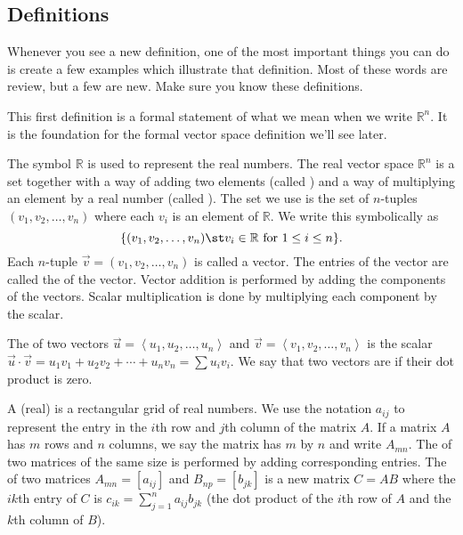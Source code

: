 \subsection{Definitions}

Whenever you see a new definition, one of the most important things you can do is create a few examples which illustrate that definition.  Most of these words are review, but a few are new.  Make sure you know these definitions.

This first definition is a formal statement of what we mean when we write $\mathbb{R}^n$.  It is the foundation for the formal vector space definition we'll see later.
\begin{definition}
The symbol $\mathbb{R}$ is used to represent the real numbers.  
The real vector space $\mathbb{R}^n$ is a set together with a way of adding two elements (called ) and a way of multiplying an element by a real number (called ).  
The set we use is the set of $n$-tuples $(v_1,v_2,\ldots, v_n)$ where each $v_i$ is an element of $\mathbb{R}$. 
We write this symbolically as 
$$
\{ (v_1,v_2,\ldots, v_n)\st v_i\in \mathbb{R} \text{ for } 1\leq i\leq n\}.$$
Each $n$-tuple $\vec v = (v_1,v_2,\ldots, v_n)$ is called a vector. 
The entries of the vector are called the  of the vector.  Vector addition is performed by adding the components of the vectors. Scalar multiplication is done by multiplying each component by the scalar. 
\end{definition}


\begin{definition} 
%
\label{def dot product}
The  of two vectors $\vec u = \left<u_1,u_2,\ldots,u_n\right>$ and $\vec v =\left<v_1,v_2,\ldots,v_n\right>$ is the scalar $\vec u\cdot \vec v = u_1v_1+u_2v_2+\cdots+u_nv_n = \sum u_iv_i$. We say that two vectors are  if their dot product is zero.
\end{definition}

\begin{definition} \label{def matrix product} 
A (real)  is a rectangular grid of real numbers.
We use the notation $a_{ij}$ to represent the entry in the $i$th row and $j$th column of the matrix $A$.  
If a matrix $A$ has $m$ rows and $n$ columns, we say the matrix has  $m$ by $n$ and write $A_{mn}$. 
The  of two matrices of the same size is performed by adding corresponding entries.  
The  of two matrices $A_{m n} = [a_{ij}]$ and $B_{np} =[b_{jk}]$ is a new matrix $C=AB$ where the $ik$th entry of $C$ is $c_{ik}=\sum_{j=1}^n a_{ij}b_{jk}$ (the dot product of the $i$th row of $A$ and the $k$th column of $B$).
\end{definition}


